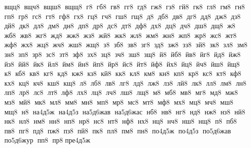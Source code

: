 вщц8  вщч8  вщш8  вщщ8  г8  гб8  гв8  гг8  гд8  гж8  гз8  гй8  гк8  гл8  гм8  гн8  гп8  гр8  гс8  гт8  гф8  гх8  гц8  гч8  гш8  гщ8  д8  дб8  дв8  дг8  дд8  дж8  дз8  дй8  дк8  дл8  дм8  дн8  дп8  др8  дс8  дт8  дф8  дх8  дц8  дч8  дш8  дщ8  ж8  жб8  жв8  жг8  жд8  жж8  жз8  жй8  жк8  жл8  жм8  жн8  жп8  жр8  жс8  жт8  жф8  жх8  жц8  жч8  жш8  жщ8  з8  зб8  зв8  зг8  зд8  зж8  зз8  зй8  зк8  зл8  зм8  зн8  зп8  зр8  зс8  зт8  зф8  зх8  зц8  зч8  зш8  зщ8  й8  йб8  йв8  йг8  йд8  йж8  йз8  йй8  йк8  йл8  йм8  йн8  йп8  йр8  йс8  йт8  йф8  йх8  йц8  йч8  йш8  йщ8  к8  кб8  кв8  кг8  кд8  кж8  кз8  кй8  кк8  кл8  км8  кн8  кп8  кр8  кс8  кт8  кф8  кх8  кц8  кч8  кш8  кщ8  л8  лб8  лв8  лг8  лд8  лж8  лз8  лй8  лк8  лл8  лм8  лн8  лп8  лр8  лс8  лт8  лф8  лх8  лц8  лч8  лш8  лщ8  м8  мб8  мв8  мг8  мд8  мж8  мз8  мй8  мк8  мл8  мм8  мн8  мп8  мр8  мс8  мт8  мф8  мх8  мц8  мч8  мш8  мщ8  н8  на4д5ж  на4д5з  на5д6жав  на5д6жас  нб8  нв8  нг8  нд8  нж8  нз8  нй8  нк8  нл8  нм8  нн8  нп8  нр8  нс8  нт8  нф8  нх8  нц8  нч8  нш8  нщ8  п8  пб8  пв8  пг8  пд8  пж8  пз8  пй8  пк8  пл8  пм8  пн8  по4д5ж  по4д5з  по5д6жав  по5д6жур  пп8  пр8 
 пре4д5ж 
